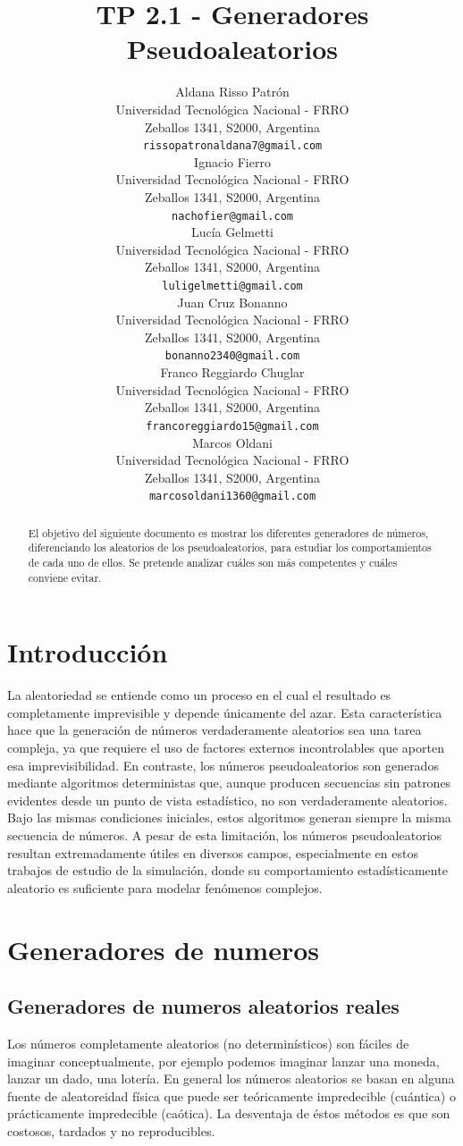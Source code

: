 \documentclass{article}
\title{TP 2.1 - Generadores Pseudoaleatorios }
\author{
 Aldana Risso Patrón \\
  Universidad Tecnológica Nacional - FRRO \\
  Zeballos 1341, S2000, Argentina \\
  \texttt{rissopatronaldana7@gmail.com} \\
   \And
 Ignacio Fierro \\
  Universidad Tecnológica Nacional - FRRO \\
  Zeballos 1341, S2000, Argentina \\
  \texttt{nachofier@gmail.com} \\
  \And
 Lucía Gelmetti \\
  Universidad Tecnológica Nacional - FRRO \\
  Zeballos 1341, S2000, Argentina \\
  \texttt{luligelmetti@gmail.com} \\
  \And
 Juan Cruz Bonanno \\
  Universidad Tecnológica Nacional - FRRO \\
  Zeballos 1341, S2000, Argentina \\
  \texttt{bonanno2340@gmail.com} \\
  \And
 Franco Reggiardo Chuglar \\
  Universidad Tecnológica Nacional - FRRO\\
  Zeballos 1341, S2000, Argentina \\
  \texttt{francoreggiardo15@gmail.com} \\
  \And
 Marcos Oldani \\
  Universidad Tecnológica Nacional - FRRO \\
  Zeballos 1341, S2000, Argentina \\
  \texttt{marcosoldani1360@gmail.com} \\
}
\begin{document}
\maketitle
\begin{abstract}
El objetivo del siguiente documento es mostrar los diferentes generadores de números, diferenciando los aleatorios de los pseudoaleatorios, para estudiar los comportamientos de cada uno de ellos. Se pretende analizar cuáles son más competentes y cuáles conviene evitar.
\end{abstract}


\section{Introducción}
La aleatoriedad se entiende como un proceso en el cual el resultado es completamente imprevisible y depende únicamente del azar. Esta característica hace que la generación de números verdaderamente aleatorios sea una tarea compleja, ya que requiere el uso de factores externos incontrolables que aporten esa imprevisibilidad. En contraste, los números pseudoaleatorios son generados mediante algoritmos deterministas que, aunque producen secuencias sin patrones evidentes desde un punto de vista estadístico, no son verdaderamente aleatorios. Bajo las mismas condiciones iniciales, estos algoritmos generan siempre la misma secuencia de números. A pesar de esta limitación, los números pseudoaleatorios resultan extremadamente útiles en diversos campos, especialmente en estos trabajos de estudio de la simulación, donde su comportamiento estadísticamente aleatorio es suficiente para modelar fenómenos complejos.


\section{Generadores de numeros}
\subsection{Generadores de numeros aleatorios reales}

Los números completamente aleatorios (no
determinísticos) son fáciles de imaginar conceptualmente, por ejemplo podemos imaginar
lanzar una moneda, lanzar un dado, una lotería.
En general los números aleatorios se basan en alguna fuente de aleatoreidad física que
puede ser teóricamente impredecible (cuántica) o prácticamente impredecible (caótica). 
La desventaja de éstos métodos es que son costosos, tardados y no reproducibles.
\end{document}

